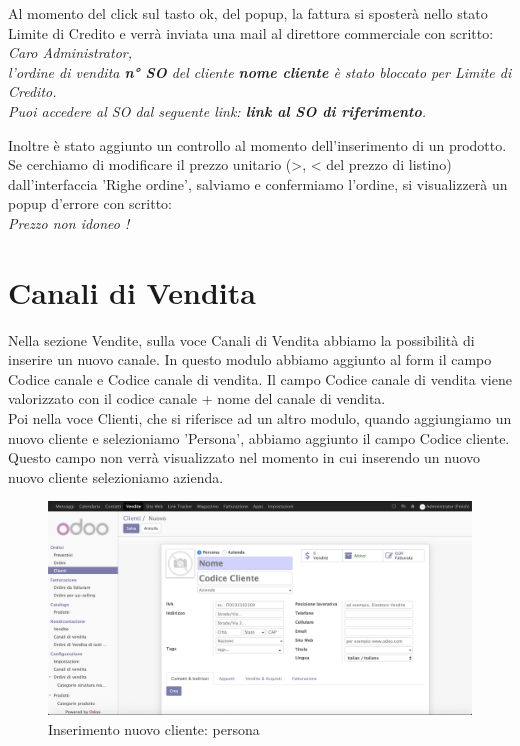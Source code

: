 Al momento del click sul tasto ok, del popup, la fattura si sposterà nello stato Limite di Credito e verrà inviata una mail al direttore commerciale con scritto:\vspace*{0.5cm}
\textit{Caro Administrator,\\
	l'ordine di vendita \textbf{n° SO} del cliente \textbf{nome cliente} è stato bloccato per Limite di Credito.\\
	Puoi accedere al SO dal seguente link: \textbf{link al SO di riferimento}.}\vspace*{0.5cm}

Inoltre è stato aggiunto un controllo al momento dell'inserimento di un prodotto. Se cerchiamo di modificare il prezzo unitario (>, < del prezzo di listino) dall'interfaccia 'Righe ordine', salviamo e confermiamo l'ordine, si visualizzerà un popup d'errore con scritto:\\ \textit{Prezzo non idoneo !}

\newpage
\section{Canali di Vendita}
Nella sezione Vendite, sulla voce Canali di Vendita abbiamo la possibilità di inserire un nuovo canale.
In questo modulo abbiamo aggiunto al form il campo Codice canale e Codice canale di vendita.
Il campo Codice canale di vendita viene valorizzato con il codice canale + nome del canale di vendita.\\
Poi nella voce Clienti, che si riferisce ad un altro modulo, quando aggiungiamo un nuovo cliente e selezioniamo 'Persona', abbiamo aggiunto il campo Codice cliente. Questo campo non verrà visualizzato nel momento in cui inserendo un nuovo nuovo cliente selezioniamo azienda.

\begin{figure}[H]
	\begin{center} \includegraphics[scale=0.3]{figures/ibg_code}
		\caption[Inserimento nuovo cliente: persona]{Inserimento nuovo cliente: persona}
		\label{fig:ibg_code}
	\end{center}
\end{figure}
\newpage

